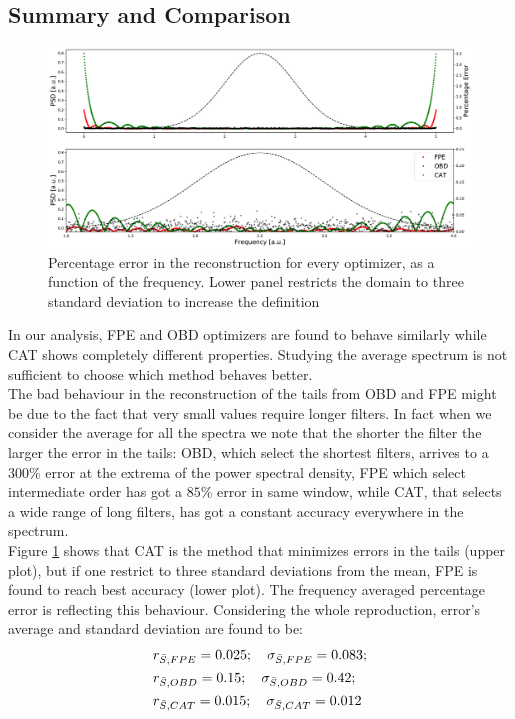 \documentclass[twocolumn,showpacs,preprintnumbers,nofootinbib,prd,
superscriptaddress,10pt]{revtex4-1}
\begin{document}
\subsection{Summary and Comparison}
\begin{figure}
    \centering
    \includegraphics[width = \linewidth]{Images/NormalPSD/Normal Residuals.pdf}
    \caption{Percentage error in the reconstruction for every optimizer, as a function of the frequency. Lower panel restricts the domain to three standard deviation to increase the definition}
    \label{fig:NormalEnsembleResiduals}
\end{figure}
In our analysis, FPE and OBD optimizers are found to behave similarly while CAT shows completely different properties. Studying the average spectrum is not sufficient to choose which method behaves better. \\ 
The bad behaviour in the reconstruction of the tails from OBD and FPE might be due to the fact that very small values require longer filters. 
In fact when we consider the average for all the spectra we note that the shorter the filter the larger the error in the tails: OBD, which select the shortest filters, arrives to a $300 \%$ error at the extrema of the power spectral density, FPE which select intermediate order has got a $85\%$ error in same window, while CAT, that selects a wide range of long filters, has got a constant accuracy everywhere in the spectrum.  \\ 
Figure \ref{fig:NormalEnsembleResiduals} shows that CAT is the method that minimizes errors in the tails (upper plot), but if one restrict to three standard deviations from the mean, FPE is found to reach best accuracy (lower plot). 
The frequency averaged percentage error is reflecting this behaviour. Considering the whole reproduction, error's average and standard deviation are found to be: 
\begin{align*}
\centering
&r_{\bar S, FPE} = 0.025; \quad \sigma_{\bar S, FPE} = 0.083;  \\
&r_{\bar S, OBD} = 0.15;\quad \sigma_{\bar S, OBD} = 0.42 ; \\ 
&r_{\bar S, CAT} = 0.015; \quad \sigma_{\bar S, CAT} = 0.012
\end{align*}
\end{document}
